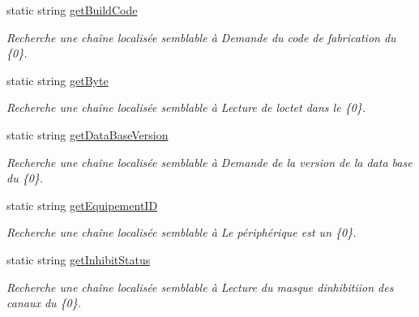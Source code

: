 \begin{DoxyCompactItemize}
static string \mbox{\hyperlink{class_device_library_1_1messages_text_a2ff352411ad8af876fe7fb650e091aa5}{get\+Build\+Code}}
\begin{DoxyCompactList}\small\item\em Recherche une chaîne localisée semblable à Demande du code de fabrication du \{0\}. \end{DoxyCompactList}\item 
static string \mbox{\hyperlink{class_device_library_1_1messages_text_a76120e98024c293607801a782c164899}{get\+Byte}}
\begin{DoxyCompactList}\small\item\em Recherche une chaîne localisée semblable à Lecture de l\textquotesingle{}octet dans le \{0\}. \end{DoxyCompactList}\item 
static string \mbox{\hyperlink{class_device_library_1_1messages_text_ab9e7a38bdab6ee7cce1c2f701e1e5fa1}{get\+Data\+Base\+Version}}
\begin{DoxyCompactList}\small\item\em Recherche une chaîne localisée semblable à Demande de la version de la data base du \{0\}. \end{DoxyCompactList}\item 
static string \mbox{\hyperlink{class_device_library_1_1messages_text_afd4b16d2d28ef8fc8e9152e92ee3875f}{get\+Equipement\+ID}}
\begin{DoxyCompactList}\small\item\em Recherche une chaîne localisée semblable à Le périphérique est un \{0\}. \end{DoxyCompactList}\item 
static string \mbox{\hyperlink{class_device_library_1_1messages_text_ae354123829e86b8cf6e13deaa2cda560}{get\+Inhibit\+Status}}
\begin{DoxyCompactList}\small\item\em Recherche une chaîne localisée semblable à Lecture du masque d\textquotesingle{}inhibitiion des canaux du \{0\}. \end{DoxyCompactList}\item 

\end{DoxyCompactItemize}
